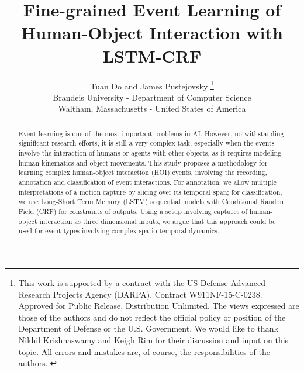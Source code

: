 \documentclass{esann}
\begin{document}
\title{Fine-grained Event Learning of Human-Object Interaction with LSTM-CRF}

\author{Tuan Do and James Pustejovsky
%
\thanks{This work is supported by a contract with the US Defense Advanced Research Projects Agency (DARPA), Contract W911NF-15-C-0238.
 Approved for Public Release, Distribution Unlimited. The views expressed are those of the authors and do not reflect the official policy or position of the Department of Defense or the U.S. Government.  We would like to thank Nikhil Krishnaswamy and
Keigh Rim for their discussion and input on this topic.  All errors and mistakes are, of course, the responsibilities of the authors..}
%
\vspace{.3cm}\\
%
Brandeis University - Department of Computer Science \\
Waltham, Massachusetts - United States of America
%
}

\maketitle

\begin{abstract}

Event learning is one of the most important problems in AI. However, notwithstanding significant research efforts, it is still a very complex task, especially when the events involve the interaction of humans or agents with other objects, as it  requires modeling human kinematics and object movements. This study proposes a methodology for learning  complex human-object interaction (HOI) events, involving the recording, annotation and classification of event interactions. For annotation, we allow multiple interpretations of a motion capture by slicing over its temporal span; for classification, we use Long-Short Term Memory (LSTM) sequential models with Conditional Randon Field (CRF) for constraints of outputs. Using a setup involving captures of human-object interaction as three dimensional inputs, we argue that this approach could be used for event types involving complex spatio-temporal dynamics. \iffalse The results showed that the proposed method achieved high improvement over baseline on our setup using three dimensional data captured. \fi
\end{abstract}
\end{document}
